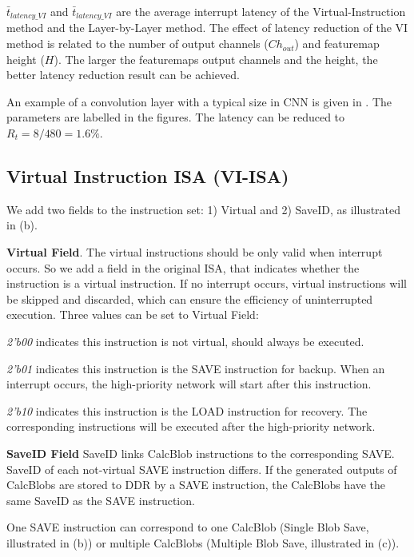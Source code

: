 $\bar{t}_{latency\_VI}$ and $\bar{t}_{latency\_VI}$ are the average interrupt latency of the Virtual-Instruction method and the Layer-by-Layer method. The effect of latency reduction of the VI method is related to the number of output channels ($Ch_{out}$) and featuremap height ($H$). The larger the featuremaps output channels and the height, the better latency reduction result can be achieved.

An example of a convolution layer with a typical size in CNN is given in . The parameters are labelled in the figures. The latency can be reduced to $R_t = 8/480 =1.6\%$.



\subsection{Virtual Instruction ISA (VI-ISA) }
\label{sec:virtualinstr}

We add two fields to the instruction set: 1) Virtual and 2) SaveID, as illustrated in (b). 

\textbf{   Virtual Field}. The virtual instructions should be only valid when interrupt occurs. So we add a field in the original ISA, that indicates whether the instruction is a virtual instruction. If no interrupt occurs, virtual instructions will be skipped and discarded, which can ensure the efficiency of uninterrupted execution. Three values can be set to Virtual Field:

	\textit{2'b00} indicates this instruction is not virtual, should always be executed.
	
	\textit{2'b01} indicates this instruction is the SAVE instruction for backup. When an interrupt occurs, the high-priority network will start after this instruction.
	
	\textit{2'b10} indicates this instruction is the LOAD instruction for recovery. The corresponding instructions will be executed after the high-priority network.

\textbf{ SaveID Field }
SaveID links CalcBlob instructions to the corresponding SAVE. SaveID of each not-virtual SAVE instruction differs. If the generated outputs of CalcBlobs are stored to DDR by a SAVE instruction, the CalcBlobs have the same SaveID as the SAVE instruction.

One SAVE instruction can correspond to one CalcBlob (Single Blob Save, illustrated in (b)) or multiple CalcBlobs (Multiple Blob Save, illustrated in (c)).

